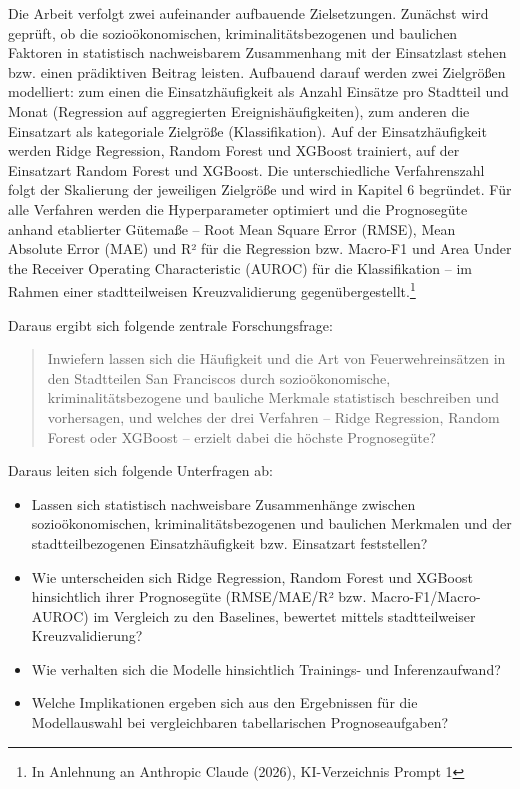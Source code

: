 \documentclass[12pt,a4paper]{article}
\begin{document}
Die Arbeit verfolgt zwei aufeinander aufbauende Zielsetzungen. Zunächst wird geprüft, ob die
sozioökonomischen, kriminalitätsbezogenen und baulichen Faktoren in statistisch nachweisbarem
Zusammenhang mit der Einsatzlast stehen bzw. einen prädiktiven Beitrag leisten. Aufbauend darauf
werden zwei Zielgrößen modelliert: zum einen die Einsatzhäufigkeit als Anzahl Einsätze pro
Stadtteil und Monat (Regression auf aggregierten Ereignishäufigkeiten), zum anderen die Einsatzart
als kategoriale Zielgröße (Klassifikation). Auf der Einsatzhäufigkeit werden Ridge Regression,
Random Forest und XGBoost trainiert, auf der Einsatzart Random Forest und XGBoost. Die
unterschiedliche Verfahrenszahl folgt der Skalierung der jeweiligen Zielgröße und wird in
Kapitel 6 begründet. Für alle Verfahren werden die Hyperparameter optimiert und die
Prognosegüte anhand etablierter Gütemaße -- Root Mean Square Error (RMSE), Mean Absolute
Error (MAE) und R² für die Regression bzw. Macro-F1 und Area Under the Receiver Operating
Characteristic (AUROC) für die Klassifikation -- im Rahmen einer stadtteilweisen
Kreuzvalidierung gegenübergestellt.\footnote{In
Anlehnung an Anthropic Claude (2026), KI-Verzeichnis Prompt 1}


Daraus ergibt sich folgende zentrale Forschungsfrage:

\begin{quote}
Inwiefern lassen sich die Häufigkeit und die Art von Feuerwehreinsätzen in den Stadtteilen
San Franciscos durch sozioökonomische, kriminalitätsbezogene und bauliche Merkmale statistisch
beschreiben und vorhersagen, und welches der drei Verfahren -- Ridge Regression, Random Forest
oder XGBoost -- erzielt dabei die höchste Prognosegüte?
\end{quote}

Daraus leiten sich folgende Unterfragen ab:

\begin{itemize}[leftmargin=*, itemsep=2pt]
  \item Lassen sich statistisch nachweisbare Zusammenhänge zwischen sozioökonomischen,
        kriminalitätsbezogenen und baulichen Merkmalen und der stadtteilbezogenen
        Einsatzhäufigkeit bzw. Einsatzart feststellen?
  \item Wie unterscheiden sich Ridge Regression, Random Forest und XGBoost hinsichtlich ihrer
        Prognosegüte (RMSE/MAE/R² bzw. Macro-F1/Macro-AUROC) im Vergleich zu den Baselines,
        bewertet mittels stadtteilweiser Kreuzvalidierung?
  \item Wie verhalten sich die Modelle hinsichtlich Trainings- und Inferenzaufwand?
  \item Welche Implikationen ergeben sich aus den Ergebnissen für die Modellauswahl bei
        vergleichbaren tabellarischen Prognoseaufgaben?
\end{itemize}
\end{document}
